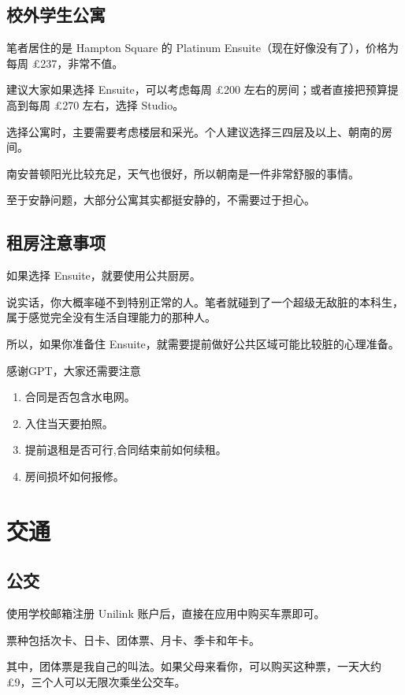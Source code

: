 \documentclass[UTF8,12pt,a4paper]{ctexart}
\begin{document}
\subsection{校外学生公寓}

笔者居住的是 Hampton Square 的 Platinum Ensuite（现在好像没有了），价格为每周 \pounds{}237，非常不值。

建议大家如果选择 Ensuite，可以考虑每周 \pounds{}200 左右的房间；或者直接把预算提高到每周 \pounds{}270 左右，选择 Studio。

选择公寓时，主要需要考虑楼层和采光。个人建议选择三四层及以上、朝南的房间。

南安普顿阳光比较充足，天气也很好，所以朝南是一件非常舒服的事情。

至于安静问题，大部分公寓其实都挺安静的，不需要过于担心。

\subsection{租房注意事项}

如果选择 Ensuite，就要使用公共厨房。

说实话，你大概率碰不到特别正常的人。笔者就碰到了一个超级无敌脏的本科生，属于感觉完全没有生活自理能力的那种人。

所以，如果你准备住 Ensuite，就需要提前做好公共区域可能比较脏的心理准备。

感谢GPT，大家还需要注意
\begin{enumerate}
    \item 合同是否包含水电网。
    \item 入住当天要拍照。
    \item 提前退租是否可行,合同结束前如何续租。
    \item 房间损坏如何报修。
\end{enumerate}

\section{交通}

\subsection{公交}

使用学校邮箱注册 Unilink 账户后，直接在应用中购买车票即可。

票种包括次卡、日卡、团体票、月卡、季卡和年卡。

其中，团体票是我自己的叫法。如果父母来看你，可以购买这种票，一天大约 \pounds{}9，三个人可以无限次乘坐公交车。
\end{document}
